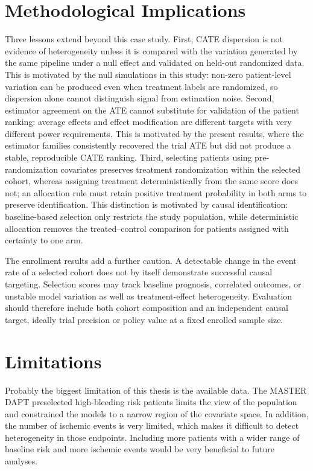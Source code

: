 \section{Methodological Implications}

Three lessons extend beyond this case study. First, CATE dispersion is not evidence of
heterogeneity unless it is compared with the variation generated by the same pipeline
under a null effect and validated on held-out randomized data. This is motivated by the
null simulations in this study: non-zero patient-level variation can be produced even
when treatment labels are randomized, so dispersion alone cannot distinguish signal
from estimation noise. Second, estimator agreement on the ATE cannot substitute for
validation of the patient ranking: average effects and effect modification are different
targets with very different power requirements. This is motivated by the present
results, where the estimator families consistently recovered the trial ATE but did not
produce a stable, reproducible CATE ranking. Third, selecting patients using
pre-randomization covariates preserves treatment randomization within the selected
cohort, whereas assigning treatment deterministically from the same score does not; an
allocation rule must retain positive treatment probability in both arms to preserve
identification. This distinction is motivated by causal identification: baseline-based
selection only restricts the study population, while deterministic allocation removes
the treated--control comparison for patients assigned with certainty to one arm.

\vspace{10pt}

The enrollment results add a further caution. A detectable change in the event rate of a
selected cohort does not by itself demonstrate successful causal targeting. Selection
scores may track baseline prognosis, correlated outcomes, or unstable model variation as
well as treatment-effect heterogeneity. Evaluation should therefore include both cohort
composition and an independent causal target, ideally trial precision or policy value at
a fixed enrolled sample size.

\section{Limitations}

Probably the biggest limitation of this thesis is the available data. The MASTER DAPT 
preselected high-bleeding risk patients limits the view of the population and constrained 
the models to a narrow region of the covariate space. In addition, the number of ischemic 
events is very limited, which makes it difficult to detect heterogeneity in those endpoints.
Including more patients with a wider range of baseline risk and more ischemic events would be
very beneficial to future analyses.

